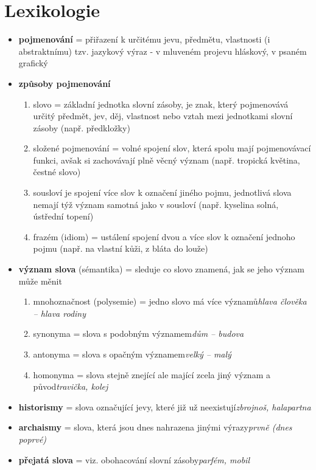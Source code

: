 \documentclass{memoir}
\begin{document}
\section*{Lexikologie}
	\begin{itemize}
		\item \textbf{pojmenování} = přiřazení k určitému jevu, předmětu, vlastnosti (i abstraktnímu) tzv. jazykový výraz - v mluveném projevu hláskový, v psaném grafický
		\item \textbf{způsoby pojmenování}
		\begin{enumerate}
			\item slovo = základní jednotka slovní zásoby, je znak, který pojmenovává určitý předmět, jev, děj, vlastnost nebo vztah mezi jednotkami slovní zásoby (např. předkložky)
			\item složené pojmenování = volné spojení slov, která spolu mají pojmenovávací funkci, avšak si zachovávají plně věcný význam (např. tropická květina, čestné slovo)
			\item sousloví je spojení více slov k označení jiného pojmu, jednotlivá slova nemají týž význam samotná jako v sousloví (např. kyselina solná, ústřední topení)
			\item frazém (idiom) = ustálení spojení dvou a více slov k označení jednoho pojmu (např. na vlastní kůži, z bláta do louže)
		\end{enumerate}
		\item \textbf{význam slova} (sémantika) = sleduje co slovo znamená, jak se jeho význam může měnit
		\begin{enumerate}
			\item mnohoznačnost (polysemie) = jedno slovo má více významů\hfill\textit{hlava člověka – hlava rodiny}
			\item synonyma = slova s podobným významem\hfill\textit{dům – budova}
			\item antonyma = slova s opačným významem\hfill\textit{velký – malý}
			\item homonyma = slova stejně znející ale mající zcela jiný význam a původ\hfill\textit{travička, kolej}
		\end{enumerate}
		\item \textbf{historismy} = slova označující jevy, které již už neexistují\hfill\textit{zbrojnoš, halapartna}
		\item \textbf{archaismy} = slova, která jsou dnes nahrazena jinými výrazy\hfill\textit{prvně (dnes poprvé)}
		\item \textbf{přejatá slova} = viz. obohacování slovní zásoby\hfill\textit{parfém, mobil}

\end{itemize}
\end{document}
